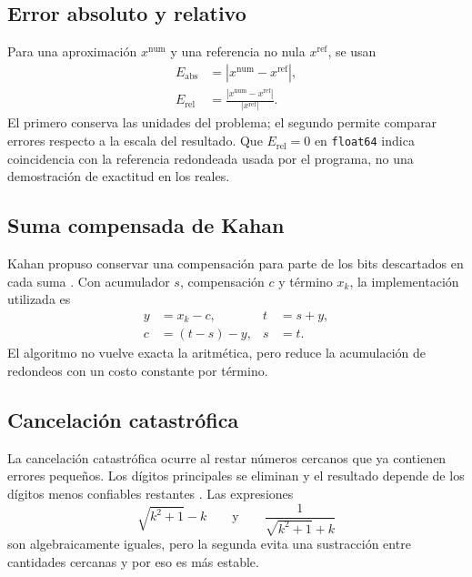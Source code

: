 \documentclass[11pt,a4paper]{article}
\newcommand{\codigo}[1]{\texttt{#1}}
\newcommand{\Erel}{E_{\mathrm{rel}}}
\begin{document}
\subsection{Error absoluto y relativo}

Para una aproximación $x^{\mathrm{num}}$ y una referencia no nula $x^{\mathrm{ref}}$, se usan
\begin{align}
E_{\mathrm{abs}}&=\left|x^{\mathrm{num}}-x^{\mathrm{ref}}\right|,\\
\Erel&=\frac{\left|x^{\mathrm{num}}-x^{\mathrm{ref}}\right|}{\left|x^{\mathrm{ref}}\right|}.
\label{eq:errorrel}
\end{align}
El primero conserva las unidades del problema; el segundo permite comparar errores respecto a la escala del resultado. Que $\Erel=0$ en \codigo{float64} indica coincidencia con la referencia redondeada usada por el programa, no una demostración de exactitud en los reales.

\subsection{Suma compensada de Kahan}

Kahan propuso conservar una compensación para parte de los bits descartados en cada suma \citep{kahan1965}. Con acumulador $s$, compensación $c$ y término $x_k$, la implementación utilizada es
\begin{align}
y&=x_k-c, & t&=s+y,\\
c&=(t-s)-y, & s&=t.
\label{eq:kahan}
\end{align}
El algoritmo no vuelve exacta la aritmética, pero reduce la acumulación de redondeos con un costo constante por término.

\subsection{Cancelación catastrófica}

La cancelación catastrófica ocurre al restar números cercanos que ya contienen errores pequeños. Los dígitos principales se eliminan y el resultado depende de los dígitos menos confiables restantes \citep{goldberg1991}. Las expresiones
\begin{equation}
\sqrt{k^2+1}-k
\qquad\text{y}\qquad
\frac{1}{\sqrt{k^2+1}+k}
\label{eq:cracional}
\end{equation}
son algebraicamente iguales, pero la segunda evita una sustracción entre cantidades cercanas y por eso es más estable.
\end{document}

